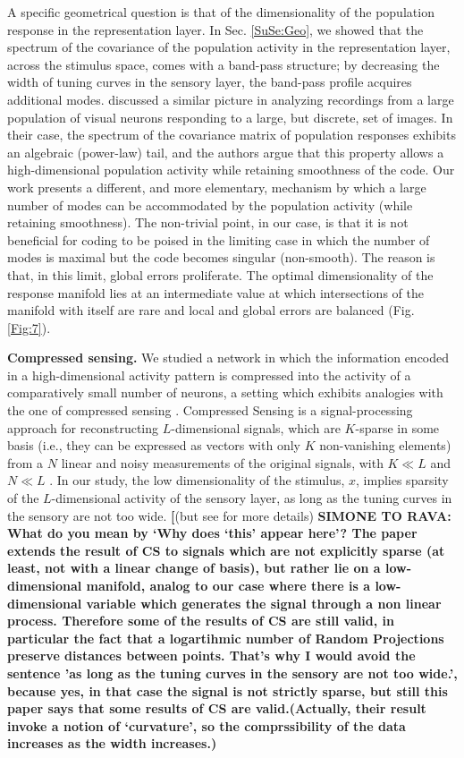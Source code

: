 \documentclass[a4paper]{article}%
\begin{document}
A specific geometrical question is that of the dimensionality of the
population response in the representation layer. In Sec. \ref{SuSe:Geo}, we
showed that the spectrum of the covariance of the population activity in the
representation layer, across the stimulus space, comes with a band-pass
structure; by decreasing the width of tuning curves in the sensory layer, the
band-pass profile acquires additional modes.
\cite{Stringer2019HighCortex} discussed a similar picture in analyzing
recordings from a large population of visual neurons responding to a large,
but discrete, set of images. In their case, the spectrum of the covariance
matrix of population responses exhibits an algebraic (power-law) tail, and the
authors argue that this property allows a high-dimensional population activity
while retaining smoothness of the code. Our work presents a different, and
more elementary, mechanism by which a large number of modes can be
accommodated by the population activity (while retaining smoothness). The
non-trivial point, in our case, is that it is not beneficial for coding to be
poised in the limiting case in which the number of modes is maximal but the
code becomes singular (non-smooth). The reason is that, in this limit, global
errors proliferate. The optimal dimensionality of the response manifold lies
at an intermediate value at which intersections of the manifold with itself
are rare and local and global errors are balanced (Fig. \ref{Fig:7}).

\textbf{Compressed sensing.} We studied a network in which the information
encoded in a high-dimensional activity pattern is compressed into the activity
of a comparatively small number of neurons, a setting which exhibits analogies
with the one of compressed sensing
\cite[]{Candes2006Near-optimalStrategies}.
Compressed
Sensing is a signal-processing approach for reconstructing $L$-dimensional
signals, which are $K$-sparse in some basis (i.e., they can be expressed as
vectors with only $K$ non-vanishing elements) from a $N$ linear and noisy
measurements of the original signals, with $K\ll L$ and $N\ll L$
\cite[]{Donoho2006CompressedSensing}. In our study, the low dimensionality of
the stimulus, $x$, implies sparsity of the $L$-dimensional activity of the
sensory layer, as long as the tuning curves in the sensory are not too wide.
\textbf{[}(but see \cite{Baraniuk2009RandomManifolds} for more details)
\textbf{SIMONE TO RAVA: What do you mean by `Why does `this' appear here'? The paper extends the result of CS to signals which are not explicitly sparse (at least, not with a linear change of basis), but rather lie on a low-dimensional manifold, analog to our case where there is a low-dimensional variable which generates the signal through a non linear process. Therefore some of the results of CS are still valid, in particular the fact that  a logartihmic number of Random Projections preserve distances between points. That's why I would avoid the sentence  'as long as the tuning curves in the sensory are not too wide.', because yes, in that case the signal is not strictly sparse, but still this paper says that  some results of CS are valid.(Actually, their result invoke a notion of `curvature', so the comprssibility of the data increases as the width increases.)} 
\end{document}
